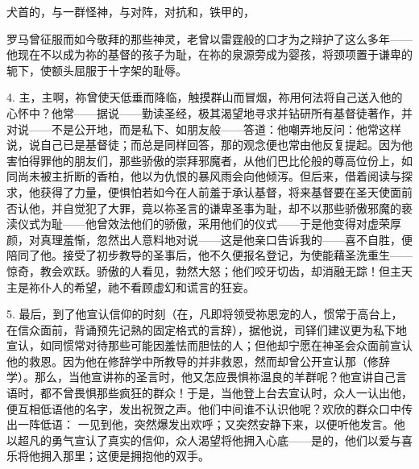 犬首的，与一群怪神，\newline{}与对阵，\newline{}对抗和，铁甲的，\par

罗马曾征服而如今敬拜的那些神灵，老曾以雷霆般的口才为之辩护了这么多年——他现在不以成为祢的基督的孩子为耻，在祢的泉源旁成为婴孩，将颈项置于谦卑的轭下，使额头屈服于十字架的耻辱。\par

4. 主，主啊，祢曾使天低垂而降临，触摸群山而冒烟，祢用何法将自己送入他的心怀中？他常——据说——勤读圣经，极其渴望地寻求并钻研所有基督徒著作，并对说——不是公开地，而是私下、如朋友般——答道：他嘲弄地反问：他常这样说，说自己已是基督徒；而总是同样回答，那的观念便也常由他反复提起。因为他害怕得罪他的朋友们，那些骄傲的崇拜邪魔者，从他们巴比伦般的尊高位份上，如同尚未被主折断的香柏，他以为仇恨的暴风雨会向他倾泻。但后来，借着阅读与探求，他获得了力量，便惧怕若如今在人前羞于承认基督，将来基督要在圣天使面前否认他，并自觉犯了大罪，竟以祢圣言的谦卑圣事为耻，却不以那些骄傲邪魔的亵渎仪式为耻——他曾效法他们的骄傲，采用他们的仪式——于是他变得对虚荣厚颜，对真理羞惭，忽然出人意料地对说——这是他亲口告诉我的——喜不自胜，便陪同了他。接受了初步教导的圣事后，他不久便报名登记，为使能藉圣洗重生——惊奇，教会欢跃。骄傲的人看见，勃然大怒；他们咬牙切齿，却消融无踪！但主天主是祢仆人的希望，祂不看顾虚幻和谎言的狂妄。\par

5. 最后，到了他宣认信仰的时刻（在，凡即将领受祢恩宠的人，惯常于高台上，在信众面前，背诵预先记熟的固定格式的言辞），据他说，司铎们建议更为私下地宣认，如同惯常对待那些可能因羞怯而胆怯的人；但他却宁愿在神圣会众面前宣认他的救恩。因为他在修辞学中所教导的并非救恩，然而却曾公开宣认那（修辞学）。那么，当他宣讲祢的圣言时，他又怎应畏惧祢温良的羊群呢？他宣讲自己言语时，都不曾畏惧那些疯狂的群众！于是，当他登上台去宣认时，众人一认出他，便互相低语他的名字，发出祝贺之声。他们中间谁不认识他呢？欢欣的群众口中传出一阵低语： 一见到他，突然爆发出欢呼；又突然安静下来，以便听他发言。他以超凡的勇气宣认了真实的信仰，众人渴望将他拥入心底——是的，他们以爱与喜乐将他拥入那里；这便是拥抱他的双手。\par


